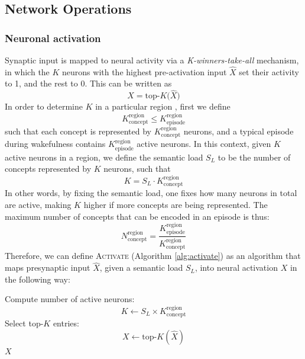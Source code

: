 \documentclass{article}
\providecommand{\DIFaddtex}[1]{{\protect\color{blue}\uwave{#1}}} %
\providecommand{\DIFaddbegin}{} %
\providecommand{\DIFaddend}{} %
\providecommand{\DIFadd}[1]{\texorpdfstring{\DIFaddtex{#1}}{#1}} %
\begin{document}
\subsection*{Network Operations}
\subsubsection*{Neuronal activation}
Synaptic input is mapped to neural activity via a \textit{K-winners-take-all} mechanism, in which the $K$ neurons with the highest pre-activation input $\hat{X}$ set their activity to 1, and the rest to 0. This can be written as
\begin{equation}
    X = \textrm{top-}K\big(\hat{X}\big)
\end{equation}
In  order to determine $K$ in a particular region \DIFaddbegin \DIFadd{(or subregion)}\DIFaddend , first we define
\begin{equation}
    K^\textrm{region}_\textrm{concept} \leq K^\textrm{region}_\textrm{episode}
\end{equation}
 such that each concept is represented by $K^\textrm{region}_\textrm{concept}$ neurons, and a typical episode during wakefulness contains $K^\textrm{region}_\textrm{episode}$ active neurons. In this context, given $K$ active neurons in a region, we define the semantic load $S_L$ to be the number of concepts represented by $K$ neurons, such that
 \begin{equation}
     K = S_L \cdot K^\textrm{region}_\textrm{concept}
     \label{eq:semantic_load}
 \end{equation}
In other words, by fixing the semantic load, one fixes how many neurons in total are active, making $K$ higher if more concepts are being represented. The maximum number of concepts that can be encoded in an episode is thus:
 \begin{equation}
     N^\textrm{region}_\textrm{concept} = \frac{K^\textrm{region}_\textrm{episode}}{K^\textrm{region}_\textrm{concept}}
 \end{equation}
 Therefore, we can define \textsc{Activate} (Algorithm \ref{alg:activate}) as an algorithm that maps presynaptic input $\hat{X}$, given a semantic load $S_L$, into neural activation $X$ in the following way:
\begin{algorithm}[h!]
\caption[]{Neuronal Activation}\label{alg:activate}
\begin{algorithmic}[1]
    \State Compute number of active neurons:
        \[
            K \gets S_L \times K^\textrm{region}_\textrm{concept}
        \]
    \State Select top-$K$ entries:
        \[
            X \gets \textrm{top-}K(\hat{X})
        \]
    \State \Return $X$
\EndFunction
\end{algorithmic}
\end{algorithm}
\end{document}
